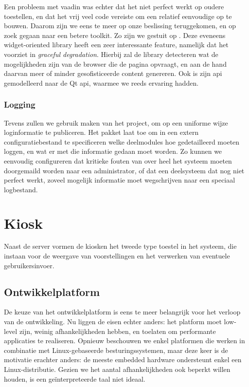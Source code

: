 Een probleem met vaadin was echter dat het niet perfect werkt op oudere toestellen, en dat het vrij veel code vereiste om een relatief eenvoudige  op te bouwen. Daarom zijn we eens te meer op onze beslissing teruggekomen, en op zoek gegaan naar een betere toolkit. Zo zijn we gestuit op . Deze eveneens widget-oriented library heeft een zeer interessante feature, namelijk dat het voorziet in \emph{graceful degradation}. Hierbij zal de library detecteren wat de mogelijkheden zijn van de browser die de pagina opvraagt, en aan de hand daarvan meer of minder gesofisticeerde content genereren. Ook is zijn \ac{api} gemodelleerd naar de Qt \ac{api}, waarmee we reeds ervaring hadden. 

\subsubsection{Logging}

Tevens zullen we gebruik maken van het  project, om op een uniforme wijze loginformatie te publiceren. Het pakket laat toe om in een extern configuratiebestand te specificeren welke deelmodules hoe gedetailleerd moeten loggen, en wat er met die informatie gedaan moet worden. Zo kunnen we eenvoudig configureren dat kritieke fouten van over heel het systeem moeten doorgemaild worden naar een administrator, of dat een deelsysteem dat nog niet perfect werkt, zoveel mogelijk informatie moet wegschrijven naar een speciaal logbestand.

\section{Kiosk}
\label{ontwerp:applicatie:kiosk}

Naast de server vormen de kiosken het tweede type toestel in het systeem, die instaan voor de weergave van voorstellingen en het verwerken van eventuele gebruikersinvoer.

\subsection{Ontwikkelplatform}

De keuze van het ontwikkelplatform is eens te meer belangrijk voor het verloop van de ontwikkeling. Nu liggen de eisen echter anders: het platform moet low-level zijn, weinig afhankelijkheden hebben, en toelaten om performante applicaties te realiseren. Opnieuw beschouwen we enkel platformen die werken in combinatie met Linux-gebaseerde besturingssystemen, maar deze keer is de motivatie erachter anders: de meeste embedded hardware ondersteunt enkel een Linux-distributie. Gezien we het aantal afhankelijkheden ook beperkt willen houden, is een geïnterpreteerde taal niet ideaal.


